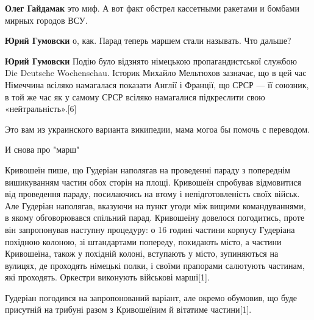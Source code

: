 \begin{itemize}
\begin{itemize}

\textbf{Олег Гайдамак} это миф. А вот факт обстрел кассетными ракетами и бомбами мирных городов ВСУ.


\textbf{Юрий Гумовски} о, как. Парад теперь маршем стали называть. Что дальше?



\textbf{Юрий Гумовски} Подію було відзнято німецькою пропагандистської службою Die
Deutsche Wochenschau. Історик Михайло Мельтюхов зазначає, що в цей час
Німеччина всіляко намагалася показати Англії і Франції, що СРСР — її союзник, в
той же час як у самому СРСР всіляко намагалися підкреслити свою
«нейтральність».[6]

Это вам из украинского варианта википедии, мама могоа бы помочь с переводом.




И снова про "марш"

Кривошеїн пише, що Гудеріан наполягав на проведенні параду з попереднім
вишикуванням частин обох сторін на площі. Кривошеїн спробував відмовитися від
проведення параду, посилаючись на втому і непідготовленість своїх військ. Але
Гудеріан наполягав, вказуючи на пункт угоди між вищими командуваннями, в якому
обговорювався спільний парад. Кривошеїну довелося погодитись, проте він
запропонував наступну процедуру: о 16 годині частини корпусу Гудеріана похідною
колоною, зі штандартами попереду, покидають місто, а частини Кривошеїна, також
у похідній колоні, вступають у місто, зупиняються на вулицях, де проходять
німецькі полки, і своїми прапорами салютують частинам, які проходять. Оркестри
виконують військові марші[1].

Гудеріан погодився на запропонований варіант, але окремо обумовив, що буде
присутній на трибуні разом з Кривошеїним й вітатиме частини[1].



\end{itemize}
\end{itemize}
